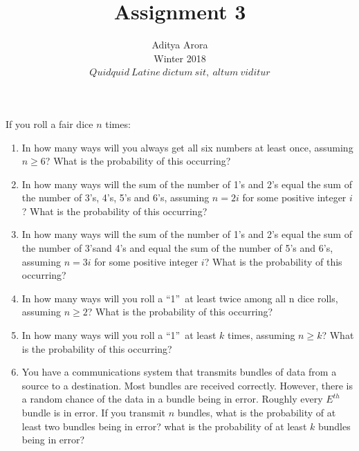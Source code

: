 \documentclass[10pt]{article}
\newenvironment{problem}[2][Problem]{\begin{trivlist}
\item[\hskip \labelsep {\bfseries #1}\hskip \labelsep {\bfseries #2.}]}{\end{trivlist}}
\begin{document}

\title{Assignment 3}%
\author{Aditya Arora\\ %
Winter 2018\\$Quidquid\ Latine\ dictum\ sit,\ altum\ viditur$} %
\maketitle

\begin{problem}{1}
If you roll a fair dice $n$ times:
\begin{enumerate}[label=(\alph*)]
    \parskip=0in
    \parsep=0in
    \itemsep=0.1in
    \item In how many ways will you always get all six numbers at least once, assuming $n \geq 6$? What is the probability of this occurring?
    \item In how many ways will the sum of the number of 1’s and 2’s equal the sum of the number of 3’s, 4’s, 5’s and 6’s, assuming $n= 2i$ for some positive integer $i$? What is the probability of this occurring?
    \item In how many ways will the sum of the number of 1’s and 2’s equal the sum of the number of 3’sand 4’s and equal the sum of the number of 5’s and 6’s, assuming $n= 3i$ for some positive integer $i$? What is the probability of this occurring?
    \item In how many ways will you roll a \textquotedblleft1\textquotedblright \ at least twice among all n dice rolls, assuming $n \geq 2$? What is the probability of this occurring?
    \item In how many ways will you roll a \textquotedblleft1\textquotedblright \ at least $k$ times, assuming $n \geq k$? What is the probability of this occurring?
    \item You have a communications system that transmits bundles of data from a source to a destination. Most bundles are received correctly. However, there is a random chance of the data in a bundle being in error. Roughly every $E^{th}$ bundle is in error. If you transmit $n$ bundles, what is the probability of at least two bundles being in error? what is the probability of at least $k$ bundles being in error?

\end{enumerate}
\end{problem}
\end{document}
